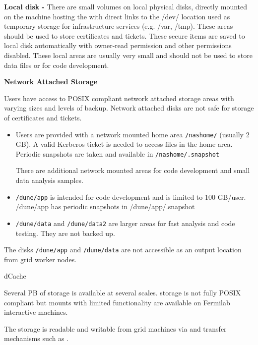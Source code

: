 \documentclass[../main-v1.tex]{subfiles}
\begin{document}
\begin{description}
    

    \item{\bf Local disk -}  There are small   volumes on local physical disks, directly
mounted on the machine hosting the  with direct links to the /dev/ location
used as temporary storage for infrastructure services (e.g. /var, /tmp).
These areas should be used to store certificates and tickets. These secure items are saved to local disk automatically with owner-read permission and other permissions disabled.
These local areas are usually very small and should not be used to store data files or for code development.
    
    \item{\bf Network Attached Storage}
    
     Users have access to POSIX compliant network attached storage areas with varying sizes and levels of backup.
     Network attached disks are
not safe for storage of certificates and tickets.

 \begin{itemize} 
   \item Users are provided with a network mounted home area {\tt /nashome/} (usually 2 GB).    A valid Kerberos ticket is needed   to access files in the home area.
Periodic snapshots are taken and available in {\tt  /nashome/.snapshot}


There are additional network mounted areas for code development and small data analysis samples. 
\item {\tt /dune/app} is intended for code development and is  limited to 100 GB/user.  /dune/app has periodic snapshots in /dune/app/.snapshot

\item  {\tt /dune/data} and {\tt /dune/data2} are larger areas for fast analysis and code testing.  They are not backed up.  
\end{itemize}
 
The  disks {\tt /dune/app} and {\tt /dune/data} are not accessible as an output location from grid worker nodes. 
 
\item{dCache}

Several PB of \cite{Millar:2014cfa} storage is available at several scales.  storage is not fully POSIX compliant but  mounts with limited functionality are available on Fermilab interactive machines. 

The  storage is readable and writable from grid machines via  and transfer mechanisms such as . 


\end{description}
\end{document}
